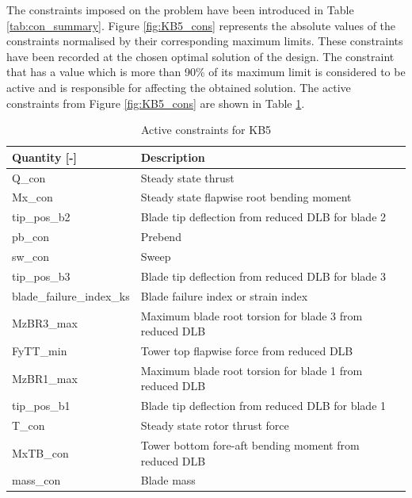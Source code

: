 The constraints imposed on the problem have been introduced in Table \ref{tab:con_summary}. Figure \ref{fig:KB5_cons} represents the absolute values of the constraints normalised by their corresponding maximum limits. These constraints have been recorded at the chosen optimal solution of the design. The constraint that has a value which is more than 90\% of its maximum limit is considered to be active and is responsible for affecting the obtained solution. The active constraints from Figure \ref{fig:KB5_cons} are shown in Table \ref{tab:KB5_cons}.

\begin{table}[!ht]
\centering
\caption{Active constraints for KB5}
\label{tab:KB5_cons}
\begin{tabular}{|l|l|}
\hline
 Quantity [-]             & Description           \\
\hline
Q\_con                    &  Steady state thrust  \\
Mx\_con                   &  Steady state flapwise root bending moment    \\
tip\_pos\_b2              &  Blade tip deflection from reduced DLB for blade 2 \\
pb\_con                   &  Prebend    \\
sw\_con                   &  Sweep                  \\
tip\_pos\_b3              &  Blade tip deflection from reduced DLB for blade 3             \\
blade\_failure\_index\_ks &  Blade failure index or strain index  \\
MzBR3\_max                &  Maximum blade root torsion for blade 3 from reduced DLB \\
FyTT\_min                 &  Tower top flapwise force from reduced DLB\\
MzBR1\_max                &  Maximum blade root torsion for blade 1 from reduced DLB \\
tip\_pos\_b1              &  Blade tip deflection from reduced DLB for blade 1 \\
T\_con                    &  Steady state rotor thrust force \\
MxTB\_con                 &  Tower bottom fore-aft bending moment from reduced DLB\\
mass\_con                  &  Blade mass      \\
\hline
\end{tabular}
\end{table}

